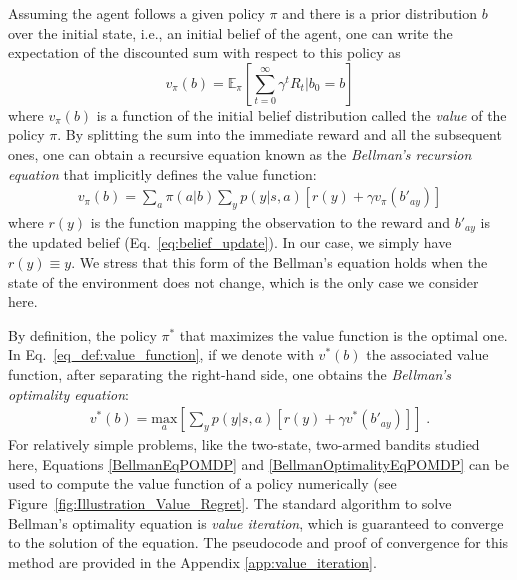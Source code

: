 \documentclass[aps,nofootinbib,groupaddress,superscriptaddress,reprint,amsmath,amssymb,graphicx,onecolumn,prx]{revtex4-2}
\begin{document}
Assuming the agent follows a given policy $\pi$ and there is a prior distribution $b$ over the initial state, i.e., an initial belief of the agent, one can write the expectation of the discounted sum with respect to this policy as
\begin{equation}
    v_\pi(b)=\mathbb{E}_\pi\left[\sum_{t=0}^\infty \gamma^tR_t\Big\vert b_0=b\right]
    \label{eq_def:value_function}
\end{equation}
where $v_\pi(b)$ is a function of the initial belief distribution called the \textit{value} of the policy $\pi$.
By splitting the sum into the immediate reward and all the subsequent ones, one can obtain a recursive equation known as the \textit{Bellman's recursion equation} that implicitly defines the value function:
\begin{align}
    v_\pi(b)=\sum_a \pi(a|b)\sum_{y}p(y\vert s,a)\left[r(y)+\gamma v_\pi(b'_{ay})\right]
    \label{BellmanEqPOMDP}
\end{align}
where $r(y)$ is the function mapping the observation to the reward and $b'_{ay}$ is the updated belief (Eq.~\eqref{eq:belief_update}). In our case, we simply have $r(y)\equiv y$. We stress that this form of the Bellman's equation holds when the state of the environment does not change, which is the only case we consider here.

By definition, the policy $\pi^*$ that maximizes the value function is the optimal one. In Eq.~\eqref{eq_def:value_function}, if we denote with $v^*(b)$ the associated value function, after separating the right-hand side, one obtains the \textit{Bellman's optimality equation}:
\begin{align}
    v^*(b)=\underset{a}{\text{max}}\left[\sum_{y}p(y\vert s,a)\left[r(y)+\gamma v^*(b'_{ay})\right]\right] \; .
    \label{BellmanOptimalityEqPOMDP}
\end{align}
For relatively simple problems, like the two-state, two-armed bandits studied here, Equations \ref{BellmanEqPOMDP} and \ref{BellmanOptimalityEqPOMDP} can be used to compute the value function of a policy numerically \cite{smallwood1973optimal} (see Figure~\ref{fig:Illustration_Value_Regret}. The standard algorithm to solve Bellman's optimality equation is \textit{value iteration}, which is guaranteed to converge to the solution of the equation. The pseudocode and proof of convergence for this method are provided in the Appendix \ref{app:value_iteration}.
\end{document}
